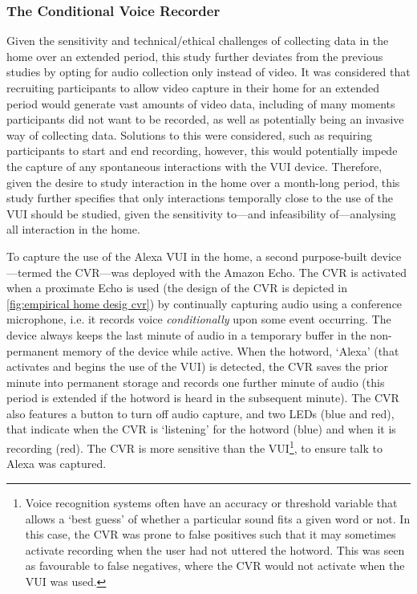 \subsubsection{The Conditional Voice Recorder}\label{sec:empirical cafe design data cvr}
\begin{revisedsubmission}
Given the sensitivity and technical/ethical challenges of collecting data in the home over an extended period, this study further deviates from the previous studies by opting for audio collection only instead of video.
It was considered that recruiting participants to allow video capture in their home for an extended period would generate vast amounts of video data, including of many moments participants did not want to be recorded, as well as potentially being an invasive way of collecting data.
Solutions to this were considered, such as requiring participants to start and end recording, however, this would potentially impede the capture of any spontaneous interactions with the \ac{VUI} device.
Therefore, given the desire to study interaction in the home over a month-long period, this study further specifies that only interactions temporally close to the use of the \ac{VUI} should be studied, given the sensitivity to---and infeasibility of---analysing all interaction in the home.
\end{revisedsubmission}

To capture the use of the Alexa \ac{VUI} in the home, a second purpose-built device---termed the \acf{CVR}---was  deployed with the Amazon Echo.
The \ac{CVR} is activated when a proximate Echo is used (the design of the \ac{CVR} is depicted in \autoref{fig:empirical home desig cvr}) by continually capturing audio using a conference microphone, i.e. it records voice \textit{conditionally} upon some event occurring.
The device always keeps the last minute of audio in a temporary buffer in the non-permanent memory of the device while active.
When the hotword, `Alexa' (that activates and begins the use of the \ac{VUI}) is detected, the \ac{CVR} saves the prior minute into permanent storage and records one further minute of audio (this period is extended if the hotword is heard in the subsequent minute).
The \ac{CVR} also features a button to turn off audio capture, and two LEDs (blue and red), that indicate when the \ac{CVR} is `listening' for the hotword (blue) and when it is recording (red).
The \ac{CVR} is more sensitive than the \ac{VUI}\footnote{Voice recognition systems often have an accuracy or threshold variable that allows a `best guess' of whether a particular sound fits a given word or not. In this case, the \ac{CVR} was prone to false positives such that it may sometimes activate recording when the user had not uttered the hotword. This was seen as favourable to false negatives, where the \ac{CVR} would not activate when the \ac{VUI} was used.}, to ensure talk to Alexa was captured.

